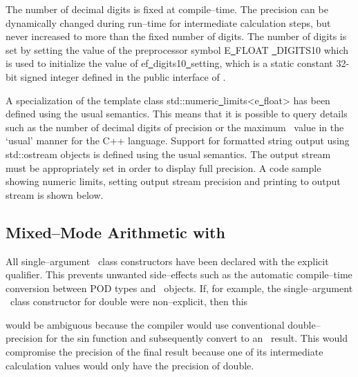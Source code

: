 The number of decimal digits is fixed at compile--time. The precision can be
dynamically changed during run--time for intermediate calculation steps,
but never increased to more than the fixed number of digits. The
number of digits is set by setting the value of
the preprocessor symbol {\courier E\underline\ FLOAT \underline\ DIGITS10}
which is used to initialize the value of
{\courier ef\underline\ \-digits10\underline\ \-setting},
which is a static constant 32-bit signed integer defined in the
public interface of \efloatbaseclass.

A specialization of the template class
{\courier std::\-nu\-me\-ric\underline\ lim\-its<e\underline\ float>}
has been defined using the usual semantics. This means that it is possible to
query details such as the number of decimal digits of precision or the
maximum \efloatclass\ value in the `usual' manner for the C++ language.
Support for formatted string output using {\courier std::o\-stream}
objects is defined using the usual semantics.
The output stream must be appropriately set
in order to display full precision. A code sample showing numeric limits,
setting output stream precision and printing to output stream is shown below.

\vspace{4.0pt}



\vspace{4.0pt}

\subsection{Mixed--Mode Arithmetic with \efloathyperref}

All single--argument \efloatclass\ class constructors have been declared
with the {\courier explicit} qualifier. This prevents unwanted
side--effects such as the automatic compile--time conversion between
POD types and \efloatclass\ objects.
If, for example, the single--argument \efloatclass\ class constructor for
{\courier double} were non--explicit, then this

\vspace{4.0pt}



\vspace{4.0pt}

\noindent would be ambiguous because the compiler would use conventional
double--precision for the sin function and subsequently convert to
an \efloatclass\ result. This would compromise the precision of the final
result because one of its intermediate calculation values would only have
the precision of {\courier double}.

